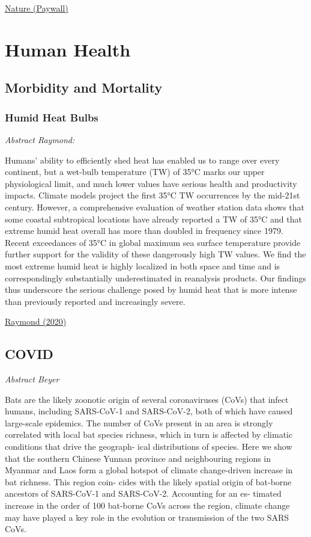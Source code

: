 \documentclass[
]{book}
\begin{document}
\href{https://www.nature.com/articles/s41558-021-01000-1}{Nature (Paywall)}

\hypertarget{human-health}{%
\section{Human Health}\label{human-health}}

\hypertarget{morbidity-and-mortality}{%
\subsection{Morbidity and Mortality}\label{morbidity-and-mortality}}

\hypertarget{humid-heat-bulbs}{%
\subsubsection{Humid Heat Bulbs}\label{humid-heat-bulbs}}

\emph{Abstract Raymond:}

Humans' ability to efficiently shed heat has enabled us to range over every continent,
but a wet-bulb temperature (TW) of 35°C marks our upper physiological limit,
and much lower values have serious health and productivity impacts.
Climate models project the first 35°C TW occurrences by the mid-21st century.
However, a comprehensive evaluation of weather station data shows that
some coastal subtropical locations have already reported a TW of 35°C and
that extreme humid heat overall has more than doubled in frequency since 1979.
Recent exceedances of 35°C in global maximum sea surface temperature provide further
support for the validity of these dangerously high TW values.
We find the most extreme humid heat is highly localized in both space and time and
is correspondingly substantially underestimated in reanalysis products.
Our findings thus underscore the serious challenge posed by humid heat
that is more intense than previously reported and increasingly severe.

\href{https://advances.sciencemag.org/content/6/19/eaaw1838}{Raymond (2020)}

\hypertarget{covid}{%
\subsection{COVID}\label{covid}}

\emph{Abstract Beyer}

Bats are the likely zoonotic origin of several coronaviruses (CoVs) that infect humans, including SARS-CoV-1 and
SARS-CoV-2, both of which have caused large-scale epidemics. The number of CoVs present in an area is strongly
correlated with local bat species richness, which in turn is affected by climatic conditions that drive the geograph-
ical distributions of species. Here we show that the southern Chinese Yunnan province and neighbouring regions
in Myanmar and Laos form a global hotspot of climate change-driven increase in bat richness. This region coin-
cides with the likely spatial origin of bat-borne ancestors of SARS-CoV-1 and SARS-CoV-2. Accounting for an es-
timated increase in the order of 100 bat-borne CoVs across the region, climate change may have played a key role
in the evolution or transmission of the two SARS CoVs.
\end{document}
